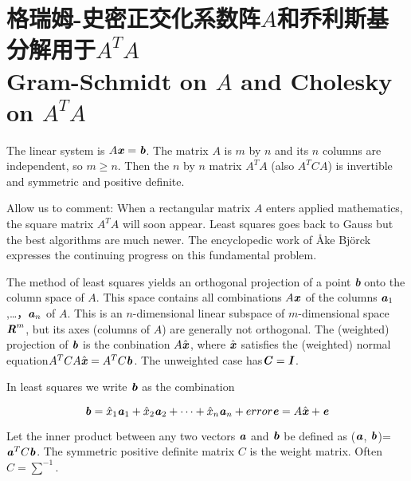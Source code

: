 \section[格瑞姆-史密正交化系数阵$A$和乔利斯基分解用于$A^{T}A$]{格瑞姆-史密正交化系数阵$A$和乔利斯基分解用于$A^{T}A$\\Gram-Schmidt on $A$ and Cholesky on $A^{T}A$}
\begin{flushleft}
The linear system is $A\textbf{\textit{x}}=\textbf{\textit{b}}$. The matrix $A$ is $m$ by $n$ and its $n$ columns are independent, so $m \geq n$. Then the $n$ by $n$ matrix $A^{T}A$ (also $A^{T}CA$) is invertible and symmetric and positive definite.	
\end{flushleft}

Allow us to comment: When a rectangular matrix $A$ enters applied mathematics, the square matrix $A^{T}A$ will soon appear. Least squares goes back to Gauss but the best algorithms are much newer. The encyclopedic work of \AA{}ke Bj\"{o}rck expresses the continuing progress on this fundamental problem.

The method of least squares yields an orthogonal projection of a point \textbf{\textit{b}} onto the column space of $A$. This space contains all combinations $A\textbf{\textit{x}}$ of the columns $\textbf{\textit{a}}_{1}$,…，$\textbf{\textit{a}}_{n}$ of $A$. This is an $n$-dimensional linear subspace of $m$-dimensional space $\textbf{\textit{R}}^{m}$, but its axes (columns of $A$) are generally not orthogonal. The (weighted) projection of $\textbf{\textit{b}}$ is the conbination $A\hat{\textbf{\textit{x}}}$, where $\hat{\textbf{\textit{x}}}$ satisfies the (weighted) normal equation$A^{T}CA\hat{\textbf{\textit{x}}}=A^{T}C\textbf{\textit{b}}$. The unweighted case has$\textbf{\textit{C}}=\textbf{\textit{I}}$.

In least squares we write $\textbf{\textit{b}}$ as the combination

	\begin{equation}\label{eq:6.1}
	\textbf{\textit{b}}=\hat{x}_{1}\textbf{\textit{a}}_{1}+\hat{x}_{2}\textbf{\textit{a}}_{2}+\cdots+\hat{x}_{n}\textbf{\textit{a}}_{n}+error\textbf{\textit{e}}=A\hat{\textbf{\textit{x}}}+\textbf{\textit{e}}
		\end{equation}
		
Let the inner product between any two vectors $\textbf{\textit{a}}$ and $\textbf{\textit{b}}$ be defined as ($\textbf{\textit{a}}$, $\textbf{\textit{b}}$)= $\textbf{\textit{a}}^{T}C\textbf{\textit{b}}$. The symmetric positive definite matrix $C$ is the weight matrix. Often$C=\sum^{-1}$.


